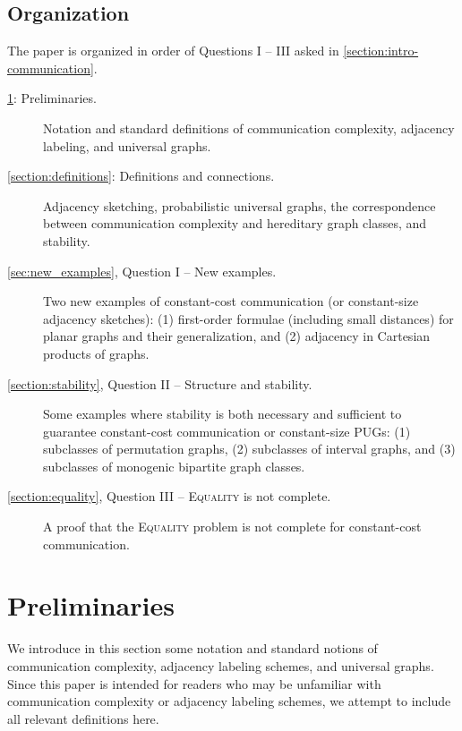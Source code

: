 \documentclass{theoretics}
\begin{document}
\subsection{Organization}
\noindent
The paper is organized in order of Questions I -- III asked in \cref{section:intro-communication}.
\begin{description}
\item[\cref{section:preliminaries}: Preliminaries.] Notation and standard definitions of
communication complexity, adjacency labeling, and universal graphs.
\item[\cref{section:definitions}: Definitions and connections.] Adjacency sketching, probabilistic universal
graphs, the correspondence between communication complexity and hereditary graph classes, and
stability.
\item[\cref{sec:new_examples}, Question I -- New examples.] Two new examples of constant-cost communication (or
constant-size adjacency sketches): (1) first-order formulae (including small distances) for planar
graphs and their generalization, and (2) adjacency in Cartesian products of graphs.
\item[\cref{section:stability}, Question II -- Structure and stability.] Some examples where stability is both necessary and
sufficient to guarantee constant-cost communication or constant-size PUGs: (1) subclasses of
permutation graphs, (2) subclasses of interval graphs, and (3) subclasses of monogenic bipartite
graph classes.
\item[\cref{section:equality}, Question III -- \textsc{Equality} is not complete.] A proof that the
\textsc{Equality} problem is not complete for constant-cost communication.
\end{description}














\section{Preliminaries}
\label{section:preliminaries}

We introduce in this section some notation and standard notions of communication complexity,
adjacency labeling schemes, and universal graphs. Since this paper is intended for readers who may
be unfamiliar with communication complexity or adjacency labeling schemes, we attempt to include all
relevant definitions here.
\end{document}
